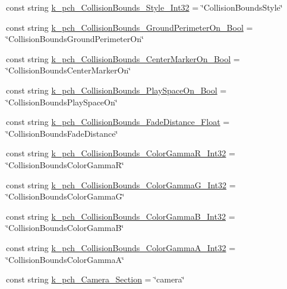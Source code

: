 \begin{DoxyCompactItemize}
\item 
const string \mbox{\hyperlink{class_valve_1_1_v_r_1_1_open_v_r_a54276a956497da318a539c92bdbaa33e}{k\+\_\+pch\+\_\+\+Collision\+Bounds\+\_\+\+Style\+\_\+\+Int32}} = \char`\"{}Collision\+Bounds\+Style\char`\"{}
\item 
const string \mbox{\hyperlink{class_valve_1_1_v_r_1_1_open_v_r_afdb9d27c88b032d5b9c975d222fdbf3c}{k\+\_\+pch\+\_\+\+Collision\+Bounds\+\_\+\+Ground\+Perimeter\+On\+\_\+\+Bool}} = \char`\"{}Collision\+Bounds\+Ground\+Perimeter\+On\char`\"{}
\item 
const string \mbox{\hyperlink{class_valve_1_1_v_r_1_1_open_v_r_ac9bbd5c692cba16e7423452f5e32b8e0}{k\+\_\+pch\+\_\+\+Collision\+Bounds\+\_\+\+Center\+Marker\+On\+\_\+\+Bool}} = \char`\"{}Collision\+Bounds\+Center\+Marker\+On\char`\"{}
\item 
const string \mbox{\hyperlink{class_valve_1_1_v_r_1_1_open_v_r_afa928f44a4681f506b92eaa09085d28f}{k\+\_\+pch\+\_\+\+Collision\+Bounds\+\_\+\+Play\+Space\+On\+\_\+\+Bool}} = \char`\"{}Collision\+Bounds\+Play\+Space\+On\char`\"{}
\item 
const string \mbox{\hyperlink{class_valve_1_1_v_r_1_1_open_v_r_ad2a57cffb39802969b2905d545aef57f}{k\+\_\+pch\+\_\+\+Collision\+Bounds\+\_\+\+Fade\+Distance\+\_\+\+Float}} = \char`\"{}Collision\+Bounds\+Fade\+Distance\char`\"{}
\item 
const string \mbox{\hyperlink{class_valve_1_1_v_r_1_1_open_v_r_a5b13ba5744dcb5b951cba1861f598580}{k\+\_\+pch\+\_\+\+Collision\+Bounds\+\_\+\+Color\+Gamma\+R\+\_\+\+Int32}} = \char`\"{}Collision\+Bounds\+Color\+GammaR\char`\"{}
\item 
const string \mbox{\hyperlink{class_valve_1_1_v_r_1_1_open_v_r_ac0df2c9fb96a0fa1b817ad1f13845c60}{k\+\_\+pch\+\_\+\+Collision\+Bounds\+\_\+\+Color\+Gamma\+G\+\_\+\+Int32}} = \char`\"{}Collision\+Bounds\+Color\+GammaG\char`\"{}
\item 
const string \mbox{\hyperlink{class_valve_1_1_v_r_1_1_open_v_r_a31fe18ade3ec8dbfd62bb72e1c15f29e}{k\+\_\+pch\+\_\+\+Collision\+Bounds\+\_\+\+Color\+Gamma\+B\+\_\+\+Int32}} = \char`\"{}Collision\+Bounds\+Color\+GammaB\char`\"{}
\item 
const string \mbox{\hyperlink{class_valve_1_1_v_r_1_1_open_v_r_a828bd33e0281e99dae90aaef01f02481}{k\+\_\+pch\+\_\+\+Collision\+Bounds\+\_\+\+Color\+Gamma\+A\+\_\+\+Int32}} = \char`\"{}Collision\+Bounds\+Color\+GammaA\char`\"{}
\item 
const string \mbox{\hyperlink{class_valve_1_1_v_r_1_1_open_v_r_a672890e15a0078255422fff40b41779b}{k\+\_\+pch\+\_\+\+Camera\+\_\+\+Section}} = \char`\"{}camera\char`\"{}

\end{DoxyCompactItemize}
